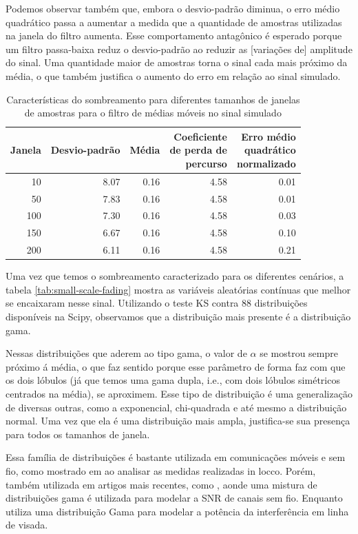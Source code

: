 \documentclass[journal,11pt,twocolumn]{IEEEtran}
\begin{document}
Podemos observar também que, embora o desvio-padrão diminua, o erro médio quadrático passa a aumentar a medida que a quantidade de amostras utilizadas na janela do filtro aumenta. Esse comportamento antagônico é esperado porque um filtro passa-baixa reduz o desvio-padrão ao reduzir as [variações de] amplitude do sinal. Uma quantidade maior de amostras torna o sinal cada mais próximo da média, o que também justifica o aumento do erro em relação ao sinal simulado.
\begin{table}[h!]
    \centering
    \begin{tabular}{r|r|r|r|r}
        Janela & Desvio-padrão & Média & \makecell[r]{Coeficiente\\ de perda de \\ percurso} & \makecell[r]{Erro médio\\quadrático\\ normalizado} \\
        \hline
        10  & 8.07 & 0.16 & 4.58 & 0.01\\
        50  & 7.83 & 0.16 & 4.58 & 0.01\\
        100 & 7.30 & 0.16 & 4.58 & 0.03\\
        150 & 6.67 & 0.16 & 4.58 & 0.10\\
        200 & 6.11 & 0.16 & 4.58 & 0.21
    \end{tabular}
    \caption{Características do sombreamento para diferentes tamanhos de janelas de amostras para o filtro de médias móveis no sinal simulado}
    \label{tab:shadowing}
\end{table}

Uma vez que temos o sombreamento caracterizado para os diferentes cenários, a tabela \ref{tab:small-scale-fading} mostra as variáveis aleatórias contínuas que melhor se encaixaram nesse sinal. Utilizando o teste KS contra 88 distribuições disponíveis na Scipy, observamos que a distribuição mais presente é a distribuição gama.

Nessas distribuições que aderem ao tipo gama, o valor de $\alpha$ se mostrou sempre próximo á média, o que faz sentido porque esse parâmetro de forma faz com que os dois lóbulos (já que temos uma gama dupla, i.e., com dois lóbulos simétricos centrados na média), se aproximem. Esse tipo de distribuição é uma generalização de diversas outras, como a exponencial, chi-quadrada e até mesmo a distribuição normal. Uma vez que ela é uma distribuição mais ampla, justifica-se sua presença para todos os tamanhos de janela.

Essa família de distribuições é bastante utilizada em comunicações móveis e sem fio, como mostrado em \cite{nakagami} ao analisar as medidas realizadas in locco. Porém, também utilizada em artigos mais recentes, como \cite{gamma-mixture}, aonde uma mistura de distribuições gama é utilizada para modelar a SNR de canais sem fio. Enquanto \cite{interference} utiliza uma distribuição Gama para modelar a potência da interferência em linha de visada.
\end{document}
